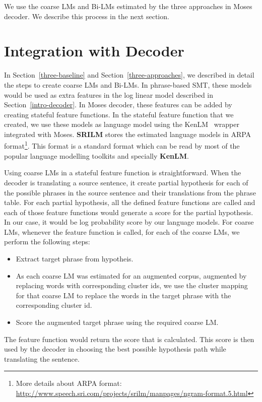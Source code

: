 We use the coarse LMs and Bi-LMs estimated by the three approaches in Moses decoder. We describe this process in the next section.


\section{Integration with Decoder}\label{feature-function}
In Section~\ref{three-baseline} and Section~\ref{three-approaches}, we described in detail the steps to create coarse LMs and Bi-LMs. In phrase-based SMT, these models would be used as extra features in the log linear model described in Section~\ref{intro-decoder}. In Moses decoder, these features can be added by creating stateful feature functions. In the stateful feature function that we created, we use these models as language model using the KenLM~\cite{KenLM} wrapper integrated with Moses. \textbf{SRILM} stores the estimated language models in ARPA format\footnote{More details about ARPA format: \url{http://www.speech.sri.com/projects/srilm/manpages/ngram-format.5.html}}. This format is a standard format which can be read by most of the popular language modelling toolkits and specially \textbf{KenLM}. 

Using coarse LMs in a stateful feature function is straightforward. When the decoder is translating a source sentence, it create partial hypothesis for each of the possible phrases in the source sentence and their translations from the phrase table. For each partial hypothesis, all the defined feature functions are called and each of those feature functions would generate a score for the partial hypothesis. In our case, it would be log probability score by our language models. For coarse LMs, whenever the feature function is called, for each of the coarse LMs, we perform the following steps:
\begin{itemize}
	\item Extract target phrase from hypotheis.
	\item As each coarse LM was estimated for an augmented corpus, augmented by replacing words with corresponding cluster ids, we use the cluster mapping for that coarse LM to replace the words in the target phrase with the corresponding cluster id.
	\item Score the augmented target phrase using the required coarse LM.
\end{itemize}

The feature function would return the score that is calculated. This score is then used by the decoder in choosing the best possible hypothesis path while translating the sentence.

